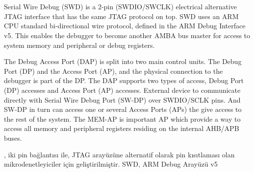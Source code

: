 \chapter{}

Serial Wire Debug (SWD) is a 2-pin (SWDIO/SWCLK) electrical alternative JTAG interface that has the same JTAG protocol on top.
SWD uses an ARM CPU standard bi-directional wire protocol, defined in the ARM Debug Interface v5.
This enables the debugger to become another AMBA bus master for access to system memory and peripheral or debug registers.



The Debug Access Port (DAP) is split into two main control units. The Debug Port (DP) and the Access Port (AP),
and the physical connection to the debugger is part of the DP. The DAP supports two types of access,
Debug Port (DP) accesses and Access Port (AP) accesses. External device to communicate directly with Serial Wire Debug Port
(SW-DP) over SWDIO/SCLK pins. And SW-DP in turn can access one or several Access Ports (APs) the give access to the rest of
the system. The MEM-AP is important AP which provide a way to access all memory
and peripheral registers residing on the internal AHB/APB buses.

, iki pin bağlantısı ile, JTAG arayüzüne alternatif olarak pin kısıtlaması olan mikrodenetleyiciler için geliştirilmiştir.
SWD, ARM Debug Arayüzü v5

